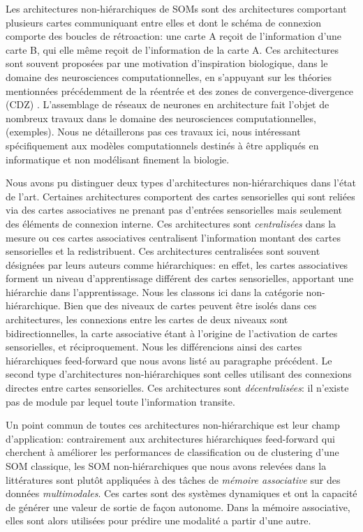 \documentclass[../main]{subfiles}
\begin{document}
Les architectures non-hiérarchiques de SOMs sont des architectures comportant plusieurs cartes communiquant entre elles et dont le schéma de connexion comporte des boucles de rétroaction: une carte A reçoit de l'information d'une carte B, qui elle même reçoit de l'information de la carte A.
Ces architectures sont souvent proposées par une motivation d'inspiration biologique, dans le domaine des neurosciences computationnelles, en s'appuyant sur les théories mentionnées précédemment de la réentrée \cite{Edelman1982GroupSA} et des zones de convergence-divergence (CDZ) \cite{damasio_time-locked_1989}.
L'assemblage de réseaux de neurones en architecture fait l'objet de nombreux travaux dans le domaine des neurosciences computationnelles, (exemples). Nous ne détaillerons pas ces travaux ici, nous intéressant spécifiquement aux modèles computationnels destinés à être appliqués en informatique et non modélisant finement la biologie.

Nous avons pu distinguer deux types d'architectures non-hiérarchiques dans l'état de l'art.
Certaines architectures comportent des cartes sensorielles qui sont reliées via des cartes associatives ne prenant pas d'entrées sensorielles mais seulement des éléments de connexion interne. Ces architectures sont \emph{centralisées} dans la mesure ou ces cartes associatives centralisent l'information  montant des cartes sensorielles et la redistribuent. Ces architectures centralisées sont souvent désignées par leurs auteurs comme hiérarchiques: en effet, les cartes associatives forment un niveau d'apprentissage différent des cartes sensorielles, apportant une hiérarchie dans l'apprentissage. Nous les classons ici dans la catégorie non-hiérarchique. Bien que des niveaux de cartes peuvent être isolés dans ces architectures, les connexions entre les cartes de deux niveaux sont bidirectionnelles, la carte associative étant à l'origine de l'activation de cartes sensorielles, et réciproquement.
Nous les différencions ainsi des cartes hiérarchiques feed-forward que nous avons listé au paragraphe précédent.
Le second type d'architectures non-hiérarchiques sont celles utilisant des connexions directes entre cartes sensorielles. Ces architectures sont \emph{décentralisées}: il n'existe pas de module par lequel toute l'information transite.

Un point commun de toutes ces architectures non-hiérarchique est leur champ d'application: contrairement aux architectures hiérarchiques feed-forward qui cherchent à améliorer les performances de classification ou de clustering d'une SOM classique, les SOM non-hiérarchiques que nous avons relevées dans la littératures sont plutôt appliquées à des tâches de \emph{mémoire associative} sur des données \emph{multimodales}. Ces cartes sont des systèmes dynamiques et ont la capacité de générer une valeur de sortie de façon autonome. Dans la mémoire associative, elles sont alors utilisées pour prédire une modalité a partir d'une autre.
\end{document}
